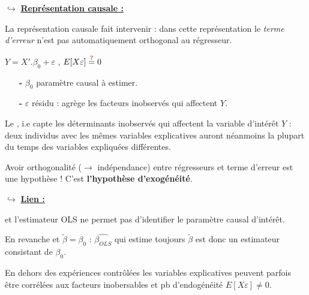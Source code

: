 \bigbreak
\noindent $\hookrightarrow$ \underline{\textbf{Représentation causale :}}\par
La représentation causale fait intervenir  : dans cette représentation le \textit{terme d'erreur} n'est pas automatiquement orthogonal au régresseur.\par
\begin{boxH}
    $Y = X'.\beta_{0} + \varepsilon$ , $E[X\varepsilon]\overset{\textbf{\red{?}}}{=}0$\par
    \begin{itemize}
        \item[\textbf{-}] $\beta_{0}$ paramètre causal à estimer.\par
        \item[\textbf{-}] $\varepsilon$ résidu : agrège les facteurs inobservés qui affectent $Y$.
    \end{itemize}
\end{boxH}
Le , i.e capte les déterminants inobservés qui affectent la variable d'intérêt $Y$ : deux individus avec les mêmes variables explicatives auront néanmoins la plupart du temps des variables expliquées différentes.\par
Avoir orthogonalité ($\rightarrow$ indépendance) entre régresseurs et terme d'erreur est une hypothèse ! C'est \textbf{l'hypothèse d'exogénéité}.

\bigbreak
\noindent $\hookrightarrow$ \underline{\textbf{Lien :}}\par
{} et l'estimateur OLS ne permet pas d'identifier le paramètre causal d'intérêt.\par
En revanche  et $\widetilde{\beta} = \beta_{0}$ : $\widehat{\beta_{OLS}}$ qui estime toujours $\widetilde{\beta}$ est donc un estimateur consistant de $\beta_{0}$.\par
En dehors des expériences contrôlées les variables explicatives peuvent parfois être corrélées aux facteurs inobersables et pb d'endogénéité $E[X\varepsilon]\neq 0$.
\bigbreak

